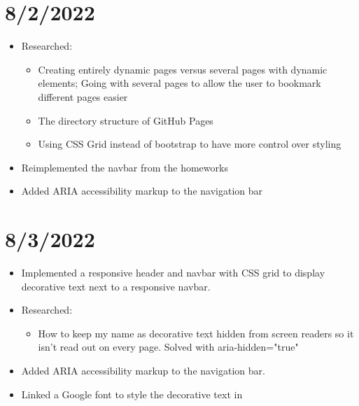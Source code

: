 \documentclass{article}
\begin{document}
\section*{8/2/2022}
\begin{itemize}
	\item Researched:
		\begin{itemize} 
	 			\item Creating entirely dynamic pages versus several pages with dynamic elements; Going with several pages to allow the user to bookmark different pages easier
	 			\item The directory structure of GitHub Pages
	 			\item Using CSS Grid instead of bootstrap to have more control over styling
		\end{itemize}
	\item Reimplemented the navbar from the homeworks
	\item Added ARIA accessibility markup to the navigation bar

\end{itemize}


\section*{8/3/2022}
\begin{itemize}
	\item Implemented a responsive header and navbar with CSS grid to display decorative text next to a responsive navbar.
	\item Researched:
		\begin{itemize} 
	 			\item How to keep my name as decorative text hidden from screen readers so it isn't read out on every page. Solved with aria-hidden="true"
		\end{itemize}
	\item Added ARIA accessibility markup to the navigation bar.
	\item Linked a Google font to style the decorative text in

\end{itemize}
\end{document}
